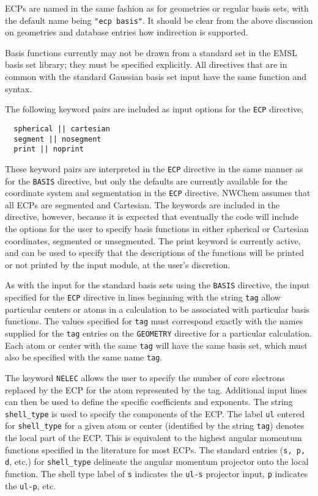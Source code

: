 ECPs are named in the same fashion as for geometries or regular basis
sets, with the default name being \verb+"ecp basis"+.  It should be
clear from the above discussion on geometries and database entries how
indirection is supported.

Basis functions currently may not be drawn from a standard set in the
EMSL basis set library; they must be specified explicitly.  All
directives that are in common with the standard Gaussian basis set
input have the same function and syntax.

The following keyword pairs are included as input options for the 
\verb+ECP+ directive,
\begin{verbatim}
  spherical || cartesian
  segment || nosegment
  print || noprint
\end{verbatim}

These keyword pairs are interpreted in the \verb+ECP+ directive in the
same manner as for the \verb+BASIS+ directive, but only the defaults
are currently available for the coordinate system and segmentation in
the \verb+ECP+ directive.  NWChem assumes that all ECPs are segmented
and Cartesian.  The keywords are included in the directive, however,
because it is expected that eventually the code will include the
options for the user to specify basis functions in either spherical or
Cartesian coordinates, segmented or unsegmented.  The print keyword is
currently active, and can be used to specify that the descriptions of
the functions will be printed or not printed by the input module, at
the user's discretion.

As with the input for the standard basis sets using the \verb+BASIS+
directive, the input specified for the \verb+ECP+ directive in lines
beginning with the string \verb+tag+ allow particular centers or atoms
in a calculation to be associated with particular basis functions.
The values specified for \verb+tag+ must correspond exactly with the
names supplied for the \verb+tag+ entries on the \verb+GEOMETRY+
directive for a particular calculation.  Each atom or center with the
same \verb+tag+ will have the same basis set, which must also be
specified with the same name \verb+tag+.

The keyword \verb+NELEC+ allows the user to specify the number of core
electrons replaced by the ECP for the atom represented by the tag.
Additional input lines can then be used to define the specific
coefficients and exponents.  The string \verb+shell_type+ is used to
specify the components of the ECP.  The label \verb+ul+ entered for
\verb+shell_type+ for a given atom or center (identified by the string
\verb+tag+) denotes the local part of the ECP.  This is equivalent to
the highest angular momentum functions specified in the literature for
most ECPs.  The standard entries (\verb+s, p, d+, etc.) for
\verb+shell_type+ delineate the angular momentum projector onto the
local function.  The shell type label of \verb+s+ indicates the
\verb+ul-s+ projector input, \verb+p+ indicates the \verb+ul-p+, etc.

